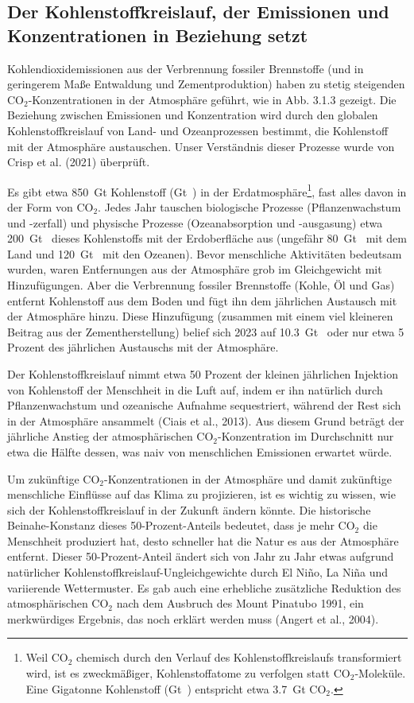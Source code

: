 \documentclass[12pt,paper=a4,DIV=12,parskip=never,chapterprefix=false,headings=standardclasses]{scrreprt}
\begin{document}
\subsection{Der Kohlenstoffkreislauf, der Emissionen und Konzentrationen in Beziehung setzt}
Kohlendioxidemissionen aus der Verbrennung fossiler Brennstoffe (und in geringerem Maße Entwaldung und Zementproduktion) haben zu stetig steigenden CO$_2$-Konzentrationen in der Atmosphäre geführt, wie in Abb. 3.1.3 gezeigt. Die Beziehung zwischen Emissionen und Konzentration wird durch den globalen Kohlenstoffkreislauf von Land- und Ozeanprozessen bestimmt, die Kohlenstoff mit der Atmosphäre austauschen. Unser Verständnis dieser Prozesse wurde von Crisp et al. (2021) überprüft.

Es gibt etwa \SI{850}{\giga\tonne} Kohlenstoff (\si{\giga\tonne{}}) in der Erdatmosphäre\footnote{Weil CO$_2$ chemisch durch den Verlauf des Kohlenstoffkreislaufs transformiert wird, ist es zweckmäßiger, Kohlenstoffatome zu verfolgen statt CO$_2$-Moleküle. Eine Gigatonne Kohlenstoff (\si{\giga\tonne{}}) entspricht etwa \SI{3.7}{\giga\tonne} CO$_2$.}, fast alles davon in der Form von CO$_2$. Jedes Jahr tauschen biologische Prozesse (Pflanzenwachstum und -zerfall) und physische Prozesse (Ozeanabsorption und -ausgasung) etwa \SI{200}{\giga\tonne{}} dieses Kohlenstoffs mit der Erdoberfläche aus (ungefähr \SI{80}{\giga\tonne{}} mit dem Land und \SI{120}{\giga\tonne{}} mit den Ozeanen). Bevor menschliche Aktivitäten bedeutsam wurden, waren Entfernungen aus der Atmosphäre grob im Gleichgewicht mit Hinzufügungen. Aber die Verbrennung fossiler Brennstoffe (Kohle, Öl und Gas) entfernt Kohlenstoff aus dem Boden und fügt ihn dem jährlichen Austausch mit der Atmosphäre hinzu. Diese Hinzufügung (zusammen mit einem viel kleineren Beitrag aus der Zementherstellung) belief sich 2023 auf \SI{10.3}{\giga\tonne{}} oder nur etwa 5 Prozent des jährlichen Austauschs mit der Atmosphäre.

Der Kohlenstoffkreislauf nimmt etwa 50 Prozent der kleinen jährlichen Injektion von Kohlenstoff der Menschheit in die Luft auf, indem er ihn natürlich durch Pflanzenwachstum und ozeanische Aufnahme sequestriert, während der Rest sich in der Atmosphäre ansammelt (Ciais et al., 2013). Aus diesem Grund beträgt der jährliche Anstieg der atmosphärischen CO$_2$-Konzentration im Durchschnitt nur etwa die Hälfte dessen, was naiv von menschlichen Emissionen erwartet würde.

Um zukünftige CO$_2$-Konzentrationen in der Atmosphäre und damit zukünftige menschliche Einflüsse auf das Klima zu projizieren, ist es wichtig zu wissen, wie sich der Kohlenstoffkreislauf in der Zukunft ändern könnte. Die historische Beinahe-Konstanz dieses 50-Prozent-Anteils bedeutet, dass je mehr CO$_2$ die Menschheit produziert hat, desto schneller hat die Natur es aus der Atmosphäre entfernt. Dieser 50-Prozent-Anteil ändert sich von Jahr zu Jahr etwas aufgrund natürlicher Kohlenstoffkreislauf-Ungleichgewichte durch El Ni\~no, La Ni\~na und variierende Wettermuster. Es gab auch eine erhebliche zusätzliche Reduktion des atmosphärischen CO$_2$ nach dem Ausbruch des Mount Pinatubo 1991, ein merkwürdiges Ergebnis, das noch erklärt werden muss (Angert et al., 2004).
\end{document}
